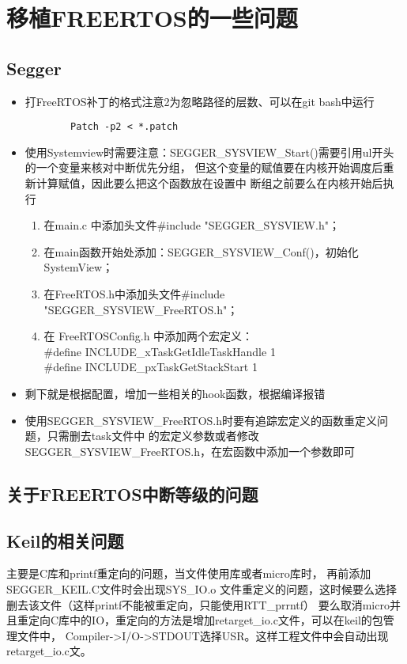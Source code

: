 \section{移植FREERTOS的一些问题}
  \subsection{Segger}
    \begin{itemize}
      \item 打FreeRTOS补丁的格式注意2为忽略路径的层数、可以在git bash中运行
      \begin{lstlisting}
        Patch -p2 < *.patch
      \end{lstlisting}
      \item 使用Systemview时需要注意：SEGGER\_SYSVIEW\_Start()需要引用ul开头的一个变量来核对中断优先分组，
      但这个变量的赋值要在内核开始调度后重新计算赋值，因此要么把这个函数放在设置中
      断组之前要么在内核开始后执行
      \begin{enumerate}
        \item 在main.c 中添加头文件\#include "SEGGER\_SYSVIEW.h"；
        \item 在main函数开始处添加：SEGGER\_SYSVIEW\_Conf()，初始化SystemView；
        \item 在FreeRTOS.h中添加头文件\#include "SEGGER\_SYSVIEW\_FreeRTOS.h"；
        \item 在 FreeRTOSConfig.h  中添加两个宏定义：\\
        \#define INCLUDE\_xTaskGetIdleTaskHandle 1 \\
        \#define INCLUDE\_pxTaskGetStackStart    1 \\
      \end{enumerate}
      \item 剩下就是根据配置，增加一些相关的hook函数，根据编译报错
      \item 使用SEGGER\_SYSVIEW\_FreeRTOS.h时要有追踪宏定义的函数重定义问题，只需删去task文件中
     的宏定义参数或者修改SEGGER\_SYSVIEW\_FreeRTOS.h，在宏函数中添加一个参数即可
    \end{itemize}
  \subsection{关于FREERTOS中断等级的问题}
  \subsection{Keil的相关问题}
   主要是C库和printf重定向的问题，当文件使用库或者micro库时，
   再前添加SEGGER\_KEIL.C文件时会出现SYS\_IO.o 
   文件重定义的问题，这时候要么选择删去该文件（这样printf不能被重定向，只能使用RTT\_prrntf）
   要么取消micro并且重定向C库中的IO，重定向的方法是增加retarget\_io.c文件，可以在keil的包管理文件中，
    Compiler->I/O->STDOUT选择USR。这样工程文件中会自动出现retarget\_io.c文。